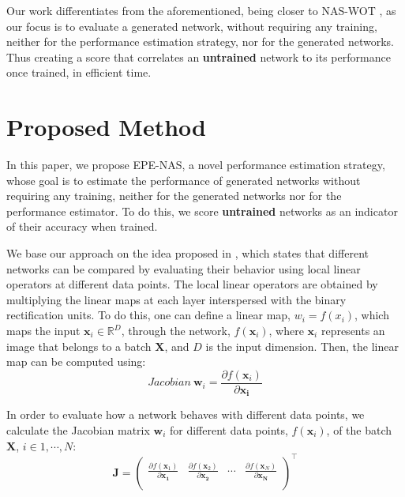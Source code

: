 \documentclass[10pt, conference]{IEEEtran}
\newcommand{\matr}[1]{\mathbf{#1}}
\begin{document}
Our work differentiates from the aforementioned, being closer to NAS-WOT \cite{mellor2020neural}, as our focus is to evaluate a generated network, without requiring any training, neither for the performance estimation strategy, nor for the generated networks. Thus creating a score that correlates an \textbf{untrained} network to its performance once trained, in efficient time.





\section{Proposed Method}
\label{proposed_method}
In this paper, we propose EPE-NAS, a novel performance estimation strategy, whose goal is to estimate the performance of generated networks without requiring any training, neither for the generated networks nor for the performance estimator. To do this, we score \textbf{untrained} networks as an indicator of their accuracy when trained.


We base our approach on the idea proposed in \cite{mellor2020neural}, which states that different networks can be compared by evaluating their behavior using local linear operators at different data points. The local linear operators are obtained by multiplying the linear maps at each layer interspersed with the binary rectification units. To do this, one can define a linear map, $w_i=f(x_i)$, which maps the input $\mathbf{x}_i  \in \mathbb{R}^{D}$, through the network, $f(\mathbf{x}_i)$, where $\mathbf{x}_i$ represents an image that belongs to a batch $\mathbf{X}$, and $D$ is the input dimension. Then, the linear map can be computed using:
\begin{equation*}
    Jacobian~\mathbf{w}_i = \frac{\partial f(\mathbf{x}_i)}{\partial \matr{x_{i}}}
\end{equation*}



In order to evaluate how a network behaves with different data points, we calculate the Jacobian matrix $\mathbf{w}_i$ for different data points, $f(\mathbf{x}_i)$, of the batch $\mathbf{X}$, $i \in 1, \cdots, N$:
\begin{equation*}
\matr{J} = 
\begin{pmatrix}
\frac{\partial f(\mathbf{x}_1)}{\partial \matr{x_{1}}} & \frac{\partial f(\mathbf{x}_2)}{\partial \matr{x_{2}}} & \cdots & \frac{\partial f(\mathbf{x}_N)}{\partial \matr{x_{N}}} \\
\end{pmatrix}^{\top}
\label{eq:J}
\end{equation*}
\end{document}
